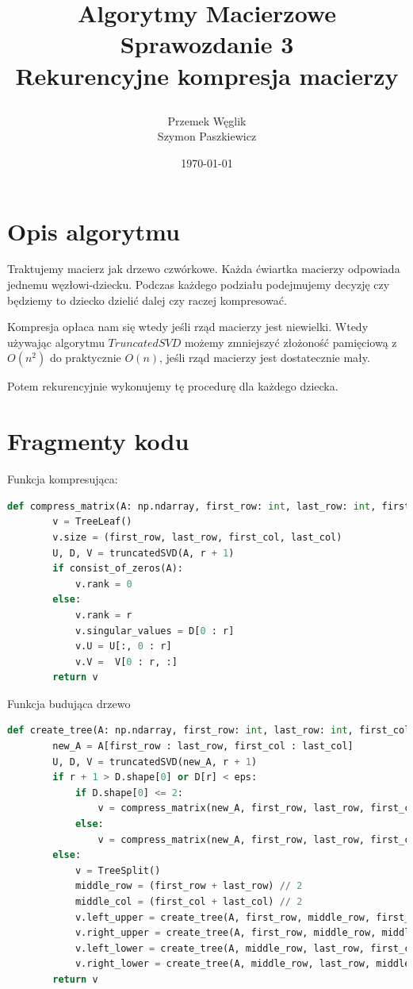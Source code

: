 \documentclass{article}
\title {
        Algorytmy Macierzowe \\
        Sprawozdanie 3 \\
        Rekurencyjne kompresja macierzy

}
\author{Przemek Węglik \\ Szymon Paszkiewicz}
\date{\today}
\begin{document}
\maketitle

\tableofcontents

\newpage

\section{Opis algorytmu}
Traktujemy macierz jak drzewo czwórkowe. Każda ćwiartka macierzy odpowiada
jednemu węzłowi-dziecku. Podczas każdego podziału podejmujemy decyzję czy będziemy
to dziecko dzielić dalej czy raczej kompresować.

Kompresja opłaca nam się wtedy jeśli rząd macierzy jest niewielki.
Wtedy używając algorytmu $TruncatedSVD$ możemy zmniejszyć złożoność pamięciową 
z $O(n^{2})$ do praktycznie $O(n)$, jeśli rząd macierzy jest dostatecznie mały.

Potem rekurencyjnie wykonujemy tę procedurę dla każdego dziecka.

\section{Fragmenty kodu}

Funkcja kompresująca:

\begin{lstlisting}[language=Python]
    def compress_matrix(A: np.ndarray, first_row: int, last_row: int, first_col: int, last_col: int, r: int) -> TreeLeaf:
        v = TreeLeaf()
        v.size = (first_row, last_row, first_col, last_col)
        U, D, V = truncatedSVD(A, r + 1)
        if consist_of_zeros(A):
            v.rank = 0
        else:
            v.rank = r
            v.singular_values = D[0 : r]
            v.U = U[:, 0 : r]
            v.V =  V[0 : r, :]
        return v
\end{lstlisting}

Funkcja budująca drzewo

\begin{lstlisting}[language=Python]
    def create_tree(A: np.ndarray, first_row: int, last_row: int, first_col: int, last_col: int, r: int, eps: float) -> TreeNode:
        new_A = A[first_row : last_row, first_col : last_col]
        U, D, V = truncatedSVD(new_A, r + 1)
        if r + 1 > D.shape[0] or D[r] < eps:
            if D.shape[0] <= 2:
                v = compress_matrix(new_A, first_row, last_row, first_col, last_col, 1)
            else:
                v = compress_matrix(new_A, first_row, last_row, first_col, last_col, r)
        else:
            v = TreeSplit()
            middle_row = (first_row + last_row) // 2
            middle_col = (first_col + last_col) // 2
            v.left_upper = create_tree(A, first_row, middle_row, first_col, middle_col, r, eps)
            v.right_upper = create_tree(A, first_row, middle_row, middle_col, last_col, r, eps)
            v.left_lower = create_tree(A, middle_row, last_row, first_col, middle_col, r, eps)
            v.right_lower = create_tree(A, middle_row, last_row, middle_col, last_col, r, eps)
        return v
\end{lstlisting}
\end{document}
